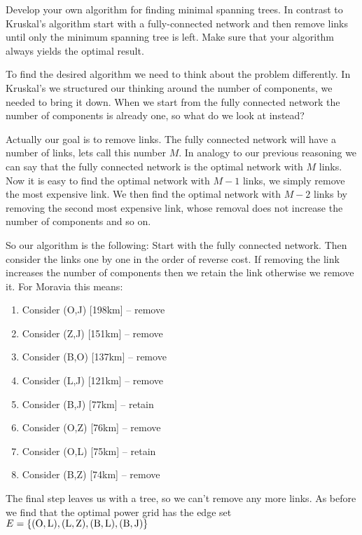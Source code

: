 
Develop your own algorithm for finding minimal spanning trees. In contrast to Kruskal's algorithm start with a fully-connected network and then remove links until only the minimum spanning tree is left. Make sure that your algorithm always yields the optimal result.


\solution
To find the desired algorithm we need to think about the problem differently. In Kruskal's we structured our thinking around the number of components, we needed to bring it down. When we start from the fully connected network the number of components is already one, so what do we look at instead? 

Actually our goal is to remove links. The fully connected network will have a number of links, lets call this number $M$. In analogy to our previous reasoning we can say that the fully connected network is the optimal network with $M$ links. 
Now it is easy to find the optimal network with $M-1$ links, we simply remove the most expensive link. We then find the optimal network with $M-2$ links by removing the second most expensive link, whose removal does not increase the number of components and so on.  

So our algorithm is the following: Start with the fully connected network. Then consider the links one by one in the order of reverse cost. If removing the link increases the number of components then we retain the link otherwise we remove it.   
For Moravia this means:
\begin{enumerate}
\item Consider (O,J) [198km] -- remove 
\item Consider (Z,J) [151km] -- remove
\item Consider (B,O) [137km] -- remove
\item Consider (L,J) [121km] -- remove
\item Consider (B,J) [77km] -- retain
\item Consider (O,Z) [76km] -- remove
\item Consider (O,L) [75km] -- retain
\item Consider (B,Z) [74km] -- remove
 \end{enumerate}
The final step leaves us with a tree, so we can't remove any more links. As before we find that the optimal power grid has the edge set $E=\{{\rm(O,L),(L,Z),(B,L),(B,J) }\}$




